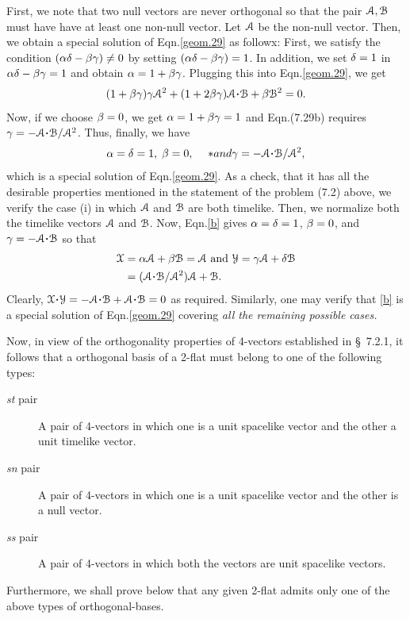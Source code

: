 \soln First, we note that two null vectors are never 
orthogonal so that the pair 
$\EuScript{A},\EuScript{B}$ 
must have  have at least one non-null vector. Let 
$\EuScript{A}$ be the  non-null vector. Then, we obtain 
a special solution of Eqn.\eqref{geom.29} as followx: 
First,  we satisfy the condition 
$({\alpha}{\delta}-{\beta}{\gamma})\neq 0$ by setting  
$({\alpha}{\delta}-{\beta}{\gamma})= 1$. In addition, we set ${\delta}=1$ 
in ${\alpha}{\delta}-{\beta}{\gamma} =1$  and obtain 
${\alpha}=1+{\beta}{\gamma}$. Plugging this into  
Eqn.\eqref{geom.29}, we get
\begin{align*}
(1+\gkb\gkg) \gkg\EuScript{A}^2 +(1+2\gkb\gkg)
\EuScript{A} \dotp\EuScript{B} + \gkb\EuScript{B}^2=0.
\end{align*}
Now, if we choose ${\beta}=0$, we get ${\alpha}=1+{\beta}{\gamma}=1$ 
and Eqn.(7.29b)  requires 
$\gkg=-\EuScript{A}\dotp\EuScript{B}/\EuScript{A}^2$. 
Thus, finally, we have
\begin{align}\label{b}
\gka=\gkd=1, \;\gkb=0,\;
\quad *{and} \gkg= -\EuScript{A}
\dotp\EuScript{B}/\EuScript{A}^2,
\end{align}
which is a special solution of Eqn.\eqref{geom.29}. As 
a check, that it has all the desirable properties 
mentioned in the statement of the  problem (7.2) 
above, 
we verify the case (i) in which $\EuScript{A}$ and 
$\EuScript{B}$ are  both timelike.  Then, we  
normalize 
both the timelike vectors $\EuScript{A}$ and 
$\EuScript{B}$. Now, Eqn.\eqref{b} gives ${\alpha}={\delta}=1$,
${\beta}=0$, and $\gkg= -\EuScript{A} \dotp\EuScript{B}$ 
so that
\begin{align*}
 \EuScript{X}&=\gka\EuScript{A}+\gkb\EuScript{B}
=\EuScript{A}  \text{ and }
\EuScript{Y}=\gkg\EuScript{A}+\gkd\EuScript{B}\\
&=(\EuScript{A}\dotp\EuScript{B}/\EuScript{A}
^2)\EuScript{A}
+\EuScript{B}.
\end{align*}
Clearly, $\EuScript{X} \dotp\EuScript{Y}=-\EuScript{A} 
\dotp\EuScript{B}+\EuScript{A} \dotp\EuScript{B}=0$ as 
required. Similarly, one may verify that \eqref{b} is 
a 
special solution of Eqn.\eqref{geom.29} covering 
\textsl{all the remaining possible cases.}  \ebx


Now, in view of the orthogonality properties of  
4-vectors established in \S~7.2.1, it follows that a  
orthogonal basis of a 2-flat must belong to one of the 
following types:
\begin{description}
\item[\textsl{st} pair] A pair of 4-vectors in which 
one is a unit spacelike vector and the other a unit 
timelike vector. \item[\textsl{sn} pair] A pair of 
4-vectors in which one is a unit  spacelike vector  
and 
the other is a null vector.
\item[\textsl{ss} pair] A pair of 4-vectors in which 
both the vectors are unit spacelike vectors. 
\end{description}
Furthermore, we shall prove below that any given 
2-flat 
admits only one of the above types of orthogonal-bases.

